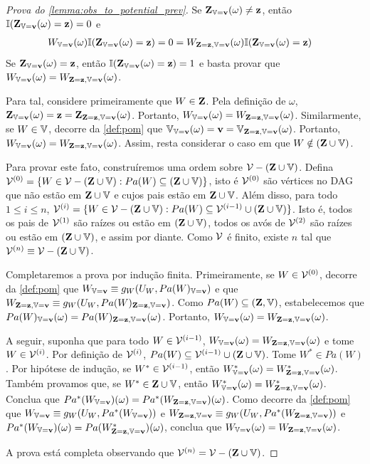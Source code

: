 \begin{proof}[Prova do \cref{lemma:obs_to_potential_prev}]
 Se $\Z_{\V=\bv}(\omega) \neq \bz$, então
 $\I(\Z_{\V=\bv}(\omega) = \bz) = 0$ e
 \begin{align*}
  W_{\V=\bv}(\omega) \I(\Z_{\V=\bv}(\omega) = \bz)
  &= 0 = W_{\Z = \bz, \V=\bv}(\omega) 
  \I(\Z_{\V=\bv}(\omega) = \bz)
 \end{align*}
 Se $\Z_{\V=\bv}(\omega) = \bz$, então
 $\I(\Z_{\V=\bv}(\omega) = \bz) = 1$ e
 basta provar que
 $W_{\V=\bv}(\omega) = W_{\Z = \bz, \V=\bv}(\omega)$.

 Para tal, considere primeiramente que $W \in \Z$.
 Pela definição de $\omega$, 
 $\Z_{\V=\bv}(\omega) = \bz = \Z_{\Z = \bz, \V=\bv}(\omega)$.
 Portanto, $W_{\V=\bv}(\omega) = W_{\Z = \bz, \V=\bv}(\omega)$.
 Similarmente, se $W \in \V$, decorre da \cref{def:pom} que
 $\V_{\V=\bv}(\omega) = \bv =\V_{\Z = \bz, \V=\bv}(\omega)$.
 Portanto, $W_{\V=\bv}(\omega) = W_{\Z = \bz, \V=\bv}(\omega)$.
 Assim, resta considerar o caso em que
 $W \notin (\Z \cup \V)$.
 
 Para provar este fato,
 construíremos uma ordem sobre $\sV-(\Z \cup \V)$.
 Defina $\sV^{(0)} = \{W \in \sV-(\Z \cup \V): Pa(W) \subseteq (\Z \cup \V)\}$,
 isto é $\sV^{(0)}$ são vértices no DAG que 
 não estão em $\Z \cup \V$ e cujos pais estão em $\Z \cup \V$.
 Além disso, para todo $1 \leq i \leq n$,
 $\sV^{(i)} = \{W \in \sV-(\Z \cup \V): 
 Pa(W) \subseteq \sV^{(i-1)} \cup (\Z \cup \V)\}$.
 Isto é, todos os pais de $\sV^{(1)}$ são raízes
 ou estão em $(\Z \cup \V)$,
 todos os avós de $\sV^{(2)}$ 
 são raízes ou estão em $(\Z \cup \V)$, e assim por diante.
 Como $\sV$ é finito, existe $n$ tal que
 $\sV^{(n)} \equiv \sV-(\Z \cup \V)$.
 
 Completaremos a prova por indução finita.
 Primeiramente, se $W \in \sV^{(0)}$,
 decorre da \cref{def:pom} que
 $W_{\V=\bv} \equiv g_W(U_W, Pa(W)_{\V=\bv})$ e que
 $W_{\Z=\bz,\V=\bv} \equiv g_W(U_W, Pa(W)_{\Z=\bz,\V=\bv})$.
 Como $Pa(W) \subseteq (\Z,\V)$, estabelecemos que
 $Pa(W)_{\V=\bv}(\omega) = Pa(W)_{\Z=\bz,\V=\bv}(\omega)$.
 Portanto, $W_{\V=\bv}(\omega) = W_{\Z=\bz,\V=\bv}(\omega)$.

 A seguir, suponha que 
 para todo $W \in \sV^{(i-1)}$,
 $W_{\V=\bv}(\omega) =  W_{\Z=\bz,\V=\bv}(\omega)$ e
 tome $W \in \sV^{(i)}$.
 Por definição de $\sV^{(i)}$, 
 $Pa(W) \subseteq \sV^{(i-1)} \cup (\Z \cup \V)$.
 Tome $W^* \in Pa(W)$.
 Por hipótese de indução,
 se $W^* \in \sV^{(i-1)}$, então
 $W^*_{\V=\bv}(\omega) =  W^*_{\Z=\bz,\V=\bv}(\omega)$.
 Também provamos que, se $W^* \in \Z \cup \V$, então
 $W^*_{\V=\bv}(\omega) =  W^*_{\Z=\bz,\V=\bv}(\omega)$.
 Conclua que 
 $Pa^*(W_{\V=\bv})(\omega) = Pa^*(W_{\Z=\bz,\V=\bv})(\omega)$.
 Como decorre da \cref{def:pom} que
 $W_{\V=\bv} \equiv g_W(U_W, Pa^*(W_{\V=\bv}))$ e
 $W_{\Z=\bz,\V=\bv} \equiv g_W(U_W, Pa^*(W_{\Z=\bz,\V=\bv}))$ e
 $Pa^*(W_{\V=\bv})(\omega) = Pa(W^*_{\Z=\bz,\V=\bv})(\omega)$,
 conclua que
 $W_{\V=\bv}(\omega) = W_{\Z=\bz,\V=\bv}(\omega)$.
 
 A prova está completa observando que
 $\sV^{(n)} = \sV - (\Z \cup \V)$.
\end{proof}


